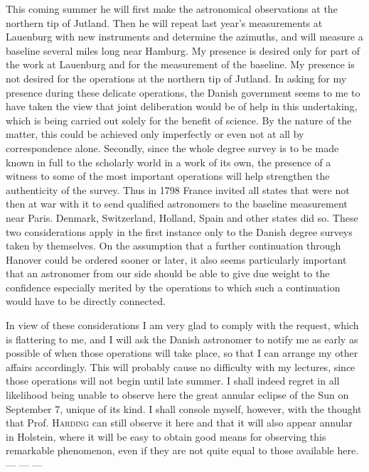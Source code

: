 \par{}%
This coming summer he will first make the astronomical observations at the northern tip of Jutland. Then he will repeat last year’s measurements at Lauenburg with new instruments and determine the azimuths, and will measure a baseline several miles long near Hamburg. My presence is desired only for part of the work at Lauenburg and for the measurement of the baseline. My presence is not desired for the operations at the northern tip of Jutland. In asking for my presence during these delicate operations, the Danish government seems to me to have taken the view that joint deliberation would be of help in this undertaking, which is being carried out solely for the benefit of science. By the nature of the matter, this could be achieved only imperfectly or even not at all by correspondence alone. Secondly, since the whole degree survey is to be made known in full to the scholarly world in a work of its own, the presence of a witness to some of the most important operations will help strengthen the authenticity of the survey. Thus in 1798 France invited all states that were not then at war with it to send qualified astronomers to the baseline measurement near Paris. Denmark, Switzerland, Holland, Spain and other states did so. These two considerations apply in the first instance only to the Danish degree surveys taken by themselves. On the assumption that a further continuation through Hanover could be ordered sooner or later, it also seems particularly important that an astronomer from our side should be able to give due weight to the confidence especially merited by the operations to which such a continuation would have to be directly connected.

In view of these considerations I am very glad to comply with the request, which is flattering to me, and I will ask the Danish astronomer to notify me as early as possible of when those operations will take place, so that I can arrange my other affairs accordingly. This will probably cause no difficulty with my lectures, since those operations will not begin until late summer. I shall indeed regret in all likelihood being unable to observe here the great annular eclipse of the Sun on September 7, unique of its kind. I shall console myself, however, with the thought that Prof. \textsc{Harding} can still observe it here and that it will also appear annular in Holstein, where it will be easy to obtain good means for observing this remarkable phenomenon, even if they are not quite equal to those available here. — — —

